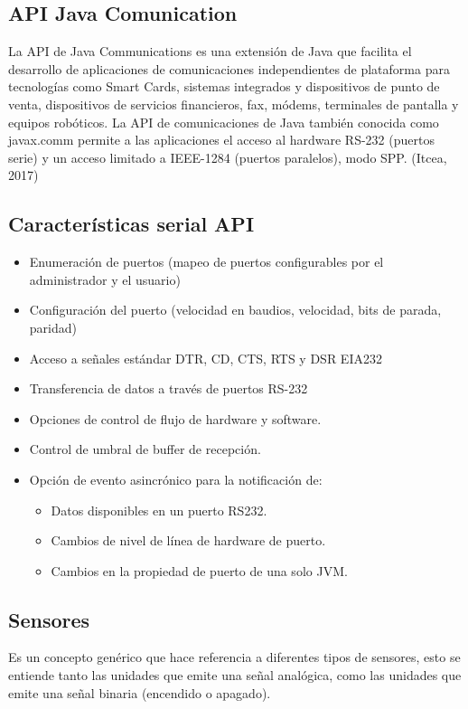 \documentclass[12pt]{report}
\begin{document}
\subsection{API Java Comunication}
La API de Java Communications es una extensión de Java que facilita el desarrollo de aplicaciones de comunicaciones independientes de plataforma para tecnologías como Smart Cards, sistemas integrados y dispositivos de punto de venta, dispositivos de servicios financieros, fax, módems, terminales de pantalla y equipos robóticos.
La API de comunicaciones de Java también conocida como javax.comm permite a las aplicaciones el acceso al hardware RS-232 (puertos serie) y un acceso limitado a IEEE-1284 (puertos paralelos), modo SPP. (Itcea, 2017)

\subsection{Características serial API}
 \begin{itemize}
     \item Enumeración de puertos (mapeo de puertos configurables por el administrador y el usuario)
     \item Configuración del puerto (velocidad en baudios, velocidad, bits de parada, paridad)
     \item Acceso a señales estándar DTR, CD, CTS, RTS y DSR EIA232
     \item Transferencia de datos a través de puertos RS-232
     \item Opciones de control de flujo de hardware y software.
     \item 	Control de umbral de buffer de recepción.
     \item Opción de evento asincrónico para la notificación de:
     \begin{itemize}
         \item Datos disponibles en un puerto RS232.
         \item Cambios de nivel de línea de hardware de puerto.
         \item Cambios en la propiedad de puerto de una solo JVM.
     \end{itemize}
 \end{itemize}
 
\subsection{Sensores}
Es un concepto genérico que hace referencia a diferentes tipos de sensores, esto se entiende tanto las unidades que emite una señal analógica, como las unidades que emite una señal binaria (encendido o apagado).
\end{document}
